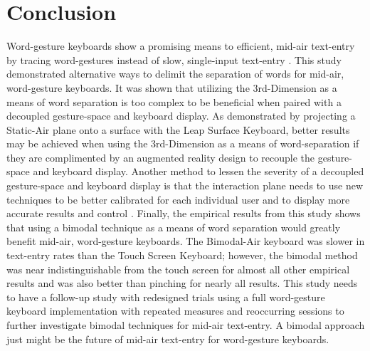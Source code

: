 \section {Conclusion}
Word-gesture keyboards show a promising means to efficient, mid-air text-entry by tracing word-gestures instead of slow, single-input text-entry \cite{ref_vulture}. This study demonstrated alternative ways to delimit the separation of words for mid-air, word-gesture keyboards. It was shown that utilizing the 3rd-Dimension as a means of word separation is too complex to be beneficial when paired with a decoupled gesture-space and keyboard display. As demonstrated by projecting a Static-Air plane onto a surface with the Leap Surface Keyboard, better results may be achieved when using the 3rd-Dimension as a means of word-separation if they are complimented by an augmented reality design to recouple the gesture-space and keyboard display. Another method to lessen the severity of a decoupled gesture-space and keyboard display is that the interaction plane needs to use new techniques to be better calibrated for each individual user and to display more accurate results and control \cite{ref_alvin_thesis,ref_darren_thesis}. Finally, the empirical results from this study shows that using a bimodal technique as a means of word separation would greatly benefit mid-air, word-gesture keyboards. The Bimodal-Air keyboard was slower in text-entry rates than the Touch Screen Keyboard; however, the bimodal method was near indistinguishable from the touch screen for almost all other empirical results and was also better than pinching for nearly all results. This study needs to have a follow-up study with redesigned trials using a full word-gesture keyboard implementation with repeated measures and reoccurring sessions to further investigate bimodal techniques for mid-air text-entry. A bimodal approach just might be the future of mid-air text-entry for word-gesture keyboards.